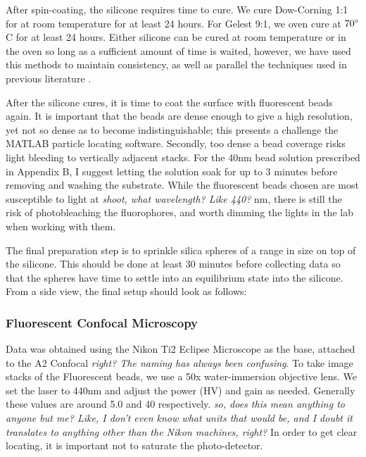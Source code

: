 After spin-coating, the silicone requires time to cure. We cure Dow-Corning 1:1 for at room temperature for at least 24 hours. For Gelest 9:1, we oven cure at $70 \degree$ C for at least 24 hours. Either silicone can be cured at room temperature or in the oven so long as a sufficient amount of time is waited, however, we have used this methods to maintain consistency, as well as parallel the techniques used in previous literature \cite{xu2017direct}.

After the silicone cures, it is time to coat the surface with fluorescent beads again. It is important that the beads are dense enough to give a high resolution, yet not so dense as to become indistinguishable; this presents a challenge the MATLAB particle locating software. Secondly, too dense a bead coverage risks light bleeding to vertically adjacent stacks. For the 40nm bead solution prescribed in Appendix B, I suggest letting the solution soak for up to 3 minutes before removing and washing the substrate. While the fluorescent beads chosen are most susceptible to light at \emph{shoot, what wavelength? Like 440?} nm, there is still the risk of photobleaching the fluorophores, and worth dimming the lights in the lab when working with them. 

The final preparation step is to sprinkle silica spheres of a range in size on top of the silicone. This should be done at least 30 minutes before collecting data so that the spheres have time to settle into an equilibrium state into the silicone. From a side view, the final setup should look as follows:



\subsubsection{Fluorescent Confocal Microscopy}
Data was obtained using the Nikon Ti2 Eclipse Microscope as the base, attached to the A2 Confocal \emph{right? The naming has always been confusing}. To take image stacks of the Fluorescent beads, we use a 50x water-immersion objective lens. We set the laser to 440nm and adjust the power (HV) and gain as needed. Generally these values are around 5.0 and 40 respectively. \emph{so, does this mean anything to anyone but me? Like, I don't even know what units that would be, and I doubt it translates to anything other than the Nikon machines, right?} In order to get clear locating, it is important not to saturate the photo-detector. 

